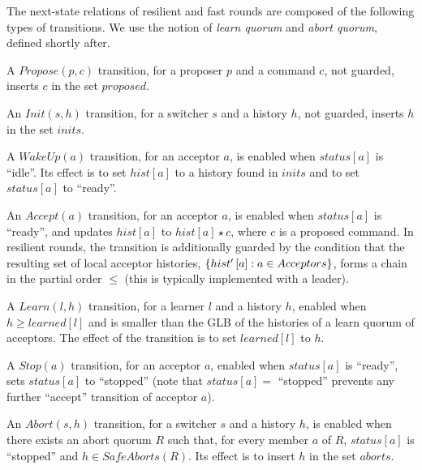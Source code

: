 The next-state relations of resilient and fast rounds are composed
of the following types of transitions. We use the notion of \emph{learn quorum} and \emph{abort quorum}, defined shortly after.
\begin{compactitem}
    \item A $Propose\left( p,c \right)$ transition, for a proposer $p$
        and a command $c$, not guarded, inserts $c$ in the set
        $proposed$. 
    \item An $Init\left( s, h \right)$ transition, for a switcher $s$
        and a history $h$, not guarded, inserts $h$ in the set $inits$.
    \item A $WakeUp\left( a \right)$ transition, for an acceptor $a$,
        is enabled when $status\left[ a \right]$ is ``idle''. Its
        effect is to set $hist\left[ a \right]$ to a history found in
        $inits$ and to set $status\left[ a \right]$ to ``ready''.
    \item An $Accept\left( a \right)$ transition, for an acceptor $a$,
        is enabled when $status\left[ a \right]$ is ``ready'', and
        updates $hist\left[ a \right]$ to $hist\left[ a \right]\star
        c$, where $c$ is a proposed command. In resilient rounds,
        the transition is additionally guarded by the condition that
        the resulting set of local acceptor histories,
        $\left\{hist'\left[ a \right] : a \in Acceptors\right\}$, forms a chain
        in the partial order $\leq$ (this is typically implemented with a
        leader).
    \item A $Learn\left( l, h \right)$ transition, for a learner $l$
      and a history $h$, enabled when $h \geq learned\left[ l \right]$ and is
      smaller than the GLB of the histories of a learn quorum of acceptors. The effect of
        the transition is to set $learned\left[ l \right]$ to $h$.
    \item A $Stop\left( a \right)$ transition, for an acceptor $a$,
        enabled when $status\left[ a \right]$ is ``ready'', sets
        $status\left[ a \right]$ to ``stopped'' (note that
        $status\left[ a \right] = $ ``stopped'' prevents any further
        ``accept'' transition of acceptor $a$).
    \item An $Abort\left( s, h \right)$ transition, for a switcher $s$
        and a history $h$, is enabled when there exists an abort quorum
        $R$ such that, for every member $a$ of $R$, $status\left[ a
        \right]$ is ``stopped'' and $h \in SafeAborts\left( R
        \right)$. Its effect is to insert  $h$ in the set $aborts$. 
\end{compactitem}

